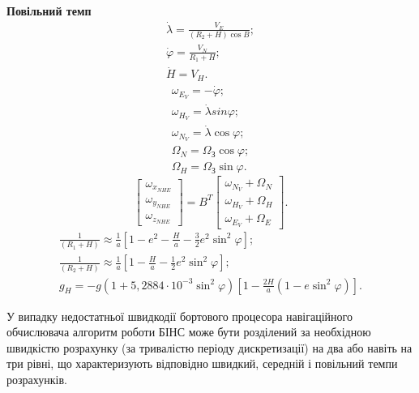 \textbf{Повільний темп}
\begin{equation} 
\label{eq:geocord} 
\begin{array}{l} 
{\dot{\lambda}=\frac{V_{E}}{(R_{2}+H)\cos B};} \\ 
{\dot{\varphi}=\frac{V_{N}}{R_{1}+H} ;} \\ 
{\dot{H}=V_{H}.} 
\end{array} 
\end{equation} 
\begin{equation} 
\label{eq:__8_26_} 
\begin{array}{l} 
{\omega_{E_{V}} =-\dot{\varphi};} \\ 
{\omega_{H_{V}} =\dot{\lambda}{sin}\varphi;} \\ 
{\omega_{N_{V}} =\dot{\lambda}\cos \varphi;} \\ 
{\Omega_{N} =\Omega_{\text{З}}\cos \varphi;} \\ 
{\Omega_{H} =\Omega_{\text{З}}\sin \varphi.} 
\end{array} 
\end{equation} 
\begin{equation} 
\label{eq:lomega}
\left[\begin{array}{c} 
{\omega_{x_{NHE}}} \\ 
{\omega_{y_{NHE}}} \\ 
{\omega_{z_{NHE}}} \end{array}\right]=B^{T} 
\left[\begin{array}{c} 
{\omega_{N_{V}} +\Omega_{N}} \\ 
{\omega_{H_{V}} +\Omega_{H}} \\ 
{\omega_{E_{V}} +\Omega_{E}} 
\end{array}\right].
\end{equation}
\begin{equation} 
\label{eq:gravity} 
\begin{array}{l}{\frac{1}{(R_{1} +H)} \approx \frac{1}{a}\left[1-e^{2} -\frac{H}{a} -\frac{3}{2} e^{2} \sin ^{2} \varphi\right];} \\ 
{\frac{1}{(R_{2} +H)} \approx \frac{1}{a} \left[1-\frac{H}{a} -\frac{1}{2} e^{2} \sin ^{2}\varphi\right]  ;} \\ 
{g_{H} =-g\left(1+5,2884\cdot 10^{-3} \sin ^{2}\varphi \right)\left[1-\frac{2H}{a} \left(1-e\sin ^{2}\varphi \right)\right].} 
\end{array} 
\end{equation} 

У випадку недостатньої швидкодії бортового процесора навігаційного обчислювача алгоритм роботи БІНС може 
бути розділений за необхідною швидкістю розрахунку (за тривалістю періоду дискретизації) 
на два або навіть на три рівні, що характеризують відповідно швидкий, середній і 
повільний темпи розрахунків. 

